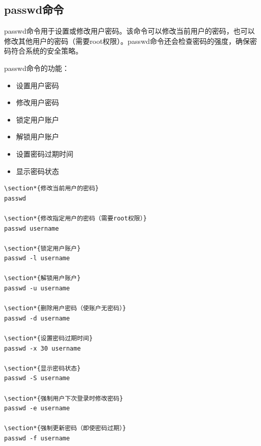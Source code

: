 \documentclass[12pt,UTF8]{ctexbook}
\begin{document}
\subsection{passwd命令}
passwd命令用于设置或修改用户密码。该命令可以修改当前用户的密码，也可以修改其他用户的密码（需要root权限）。passwd命令还会检查密码的强度，确保密码符合系统的安全策略。

passwd命令的功能：
\begin{itemize}
    \item 设置用户密码
    \item 修改用户密码
    \item 锁定用户账户
    \item 解锁用户账户
    \item 设置密码过期时间
    \item 显示密码状态
\end{itemize}

\begin{verbatim}
\section*{修改当前用户的密码}
passwd

\section*{修改指定用户的密码（需要root权限）}
passwd username

\section*{锁定用户账户}
passwd -l username

\section*{解锁用户账户}
passwd -u username

\section*{删除用户密码（使账户无密码）}
passwd -d username

\section*{设置密码过期时间}
passwd -x 30 username

\section*{显示密码状态}
passwd -S username

\section*{强制用户下次登录时修改密码}
passwd -e username

\section*{强制更新密码（即使密码过期）}
passwd -f username
\end{verbatim}
\end{document}
